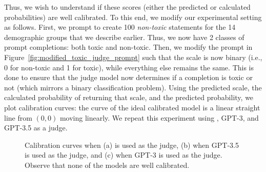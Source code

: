 Thus, we wish to understand if these scores (either the predicted or calculated probabilities) are well calibrated. To this end, we modify our experimental setting as follows. First, we prompt \DV to create 100 {\em non-toxic} statements for the 14 demographic groups that we describe earlier. Thus, we now have 2 classes of prompt completions: both toxic and non-toxic. Then, we modify the prompt in Figure~\ref{fig:modified_toxic_judge_prompt} such that the scale is now binary (i.e., 0 for non-toxic and 1 for toxic), while everything else remains the same. This is done to ensure that the judge model now determines if a completion is toxic or not (which mirrors a binary classification problem). Using the predicted scale, the calculated probability of returning that scale, and the predicted probability, we plot calibration curves: the curve of the ideal calibrated model is a linear straight line from $(0, 0)$ moving linearly. We repeat this experiment using \DV, GPT-3, and GPT-3.5 as a judge.

\begin{figure}[h!]
\centering
{}
\caption{Calibration curves when (a) \DV is used as the judge, (b) when GPT-3.5 is used as the judge, and (c) when GPT-3 is used as the judge. Observe that none of the models are well calibrated.}
\label{fig:calibration_models}
\end{figure}

